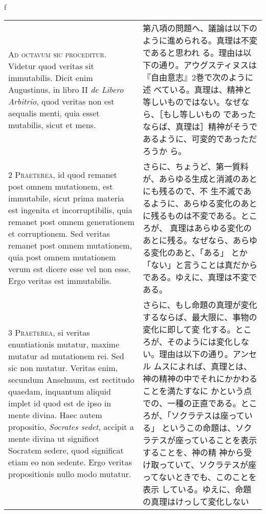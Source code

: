 \\f\documentclass[10pt]{jsarticle} %
\begin{document}
\begin{longtable}{p{21em}p{21em}}

{\huge A}{\scshape d octavum sic proceditur}. Videtur quod veritas sit
immutabilis. Dicit enim Augustinus, in libro II {\itshape de Libero
Arbitrio}, quod veritas non est aequalis menti, quia esset mutabilis,
sicut et mens.

&

第八項の問題へ、議論は以下のように進められる。真理は不変であると思われ
る。理由は以下の通り。アウグスティヌスは『自由意志』2巻で次のように述
べている。真理は、精神と等しいものではない。なぜなら、［もし等しいもの
であったならば、真理は］精神がそうであるように、可変的であっただろうか
ら。


\\


{\scshape 2 Praeterea}, id quod remanet post omnem mutationem, est
immutabile, sicut prima materia est ingenita et incorruptibilis, quia
remanet post omnem generationem et corruptionem. Sed veritas remanet
post omnem mutationem, quia post omnem mutationem verum est dicere
esse vel non esse. Ergo veritas est immutabilis.

&

さらに、ちょうど、第一質料が、あらゆる生成と消滅のあとにも残るので、不
生不滅であるように、あらゆる変化のあとに残るものは不変である。ところが、
真理はあらゆる変化のあとに残る。なぜなら、あらゆる変化のあと、「ある」
とか「ない」と言うことは真だからである。ゆえに、真理は不変である。

\\


{\scshape 3 Praeterea}, si veritas enuntiationis mutatur, maxime
mutatur ad mutationem rei. Sed sic non mutatur. Veritas enim, secundum
Anselmum, est rectitudo quaedam, inquantum aliquid implet id quod est
de ipso in mente divina. Haec autem propositio, {\itshape Socrates
sedet}, accipit a mente divina ut significet Socratem sedere, quod
significat etiam eo non sedente. Ergo veritas propositionis nullo modo
mutatur.

&

さらに、もし命題の真理が変化するならば、最大限に、事物の変化に即して変
 化する。ところが、そのようには変化しない。理由は以下の通り。アンセル
 ムスによれば、真理とは、神の精神の中でそれにかかわることを満たすなに
 かという点での、一種の正直である。ところが、「ソクラテスは座っている」
 というこの命題は、ソクラテスが座っていることを表示することを、神の精
 神から受け取っていて、ソクラテスが座ってないときでも、このことを表示
 している。ゆえに、命題の真理はけっして変化しない


\end{longtable}
\end{document}
